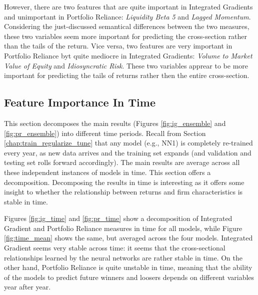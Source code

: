 	However, there are two features that are quite important in Integrated Gradients and unimportant in Portfolio Reliance: \textit{Liquidity Beta 5} and \textit{Lagged Momentum}. Considering the just-discussed semantical differences between the two measures, these two variables seem more important for predicting the cross-section rather than the tails of the return. Vice versa, two features are very important in Portfolio Reliance byt quite mediocre in Integrated Gradients: \textit{Volume to Market Value of Equity} and \textit{Idiosyncratic Risk}. These two variables apprear to be more important for predicting the tails of returns rather then the entire cross-section. 

	\subsection{Feature Importance In Time}
	
		This section decomposes the main results (Figures \ref{fig:ig_ensemble} and \ref{fig:pr_ensemble}) into different time periods. Recall from Section \ref{chap:train_regularize_tune} that any model (e.g., NN1) is completely re-trained every year, as new data arrives and the training set expands (and validation and testing set rolls forward accordingly). The main results are average across all these independent instances of models in time. This section offers a decomposition. Decomposing the results in time is interesting as it offers some insight to whether the relationship between returns and firm characteristics is stable in time. 
		
		Figures \ref{fig:ig_time} and \ref{fig:pr_time} show a decomposition of Integrated Gradient and Portfolio Reliance measures in time for all models, while Figure \ref{fig:time_mean} shows the same, but averaged across the four models. Integrated Gradient seems very stable across time: it seems that the cross-sectional relationships learned by the neural networks are rather stable in time. On the other hand, Portfolio Reliance is quite unstable in time, meaning that the ability of the models to predict future winners and loosers depends on different variables year after year. 
	
